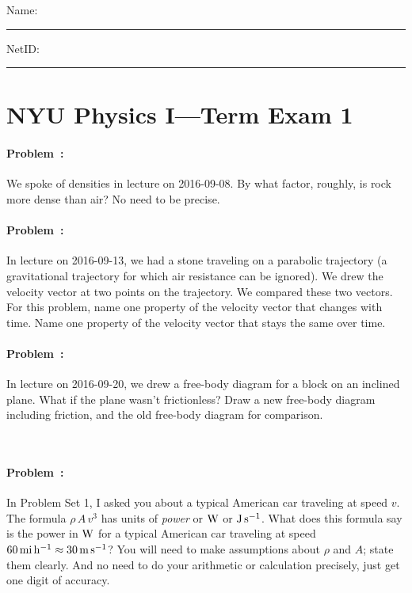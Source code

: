 \documentclass[12pt]{article}
\begin{document}
\noindent
Name: \rule[-1ex]{0.55\textwidth}{0.1pt}
NetID: \rule[-1ex]{0.2\textwidth}{0.1pt}

\section*{NYU Physics I---Term Exam 1}

\paragraph{Problem~\theproblem:}%
We spoke of densities in lecture on 2016-09-08. By what factor,
roughly, is rock more dense than air? No need to be precise.

\vfill

\paragraph{Problem~\theproblem:}%
In lecture on 2016-09-13, we had a stone traveling on a parabolic
trajectory (a gravitational trajectory for which air resistance can be
ignored). We drew the velocity vector at two points on the
trajectory. We compared these two vectors. For this problem, name one
property of the velocity vector that changes with time. Name one
property of the velocity vector that stays the same over time.

\vfill

\paragraph{Problem~\theproblem:}%
In lecture on 2016-09-20, we drew a free-body diagram for a block on
an inclined plane. What if the plane wasn't frictionless? Draw a new
free-body diagram including friction, and the old free-body diagram
for comparison.

\vfill
~

\clearpage
\paragraph{Problem~\theproblem:}%
In Problem Set 1, I asked you about a typical American car traveling
at speed $v$.  The formula $\rho\,A\,v^3$ has units of \emph{power} or
$\mathrm{W}$ or $\mathrm{J}\,\mathrm{s}^{-1}$.  What does this formula say is the power in
$\mathrm{W}$ for a typical American car traveling at speed $60\,\mathrm{mi}\,\mathrm{h}^{-1}\approx
30\,\mathrm{m}\,\mathrm{s}^{-1}$? You will need to make assumptions about $\rho$ and $A$; state them
clearly. And no need to do your arithmetic or calculation precisely, just
get one digit of accuracy.
\end{document}
